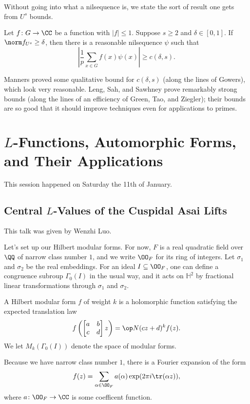 \documentclass{article}
\begin{document}
Without going into what a nilsequence is, we state the sort of result one gets from $U^s$ bounds.
\begin{theorem}
	Let $f\colon G\to\CC$ be a function with $\left|f\right|\le1$. Suppose $s\ge2$ and $\delta\in[0,1]$. If $\norm f_{U^s}\ge\delta$, then there is a reasonable nilsequence $\psi$ such that
	\[\left|\frac1p\sum_{x\in G}f(x)\psi(x)\right|\ge c(\delta,s).\]
\end{theorem}
Manners proved some qualitative bound for $c(\delta,s)$ (along the lines of Gowers), which look very reasonable. Leng, Sah, and Sawhney prove remarkably strong bounds (along the lines of an efficiency of Green, Tao, and Ziegler); their bounds are so good that it should improve techniques even for applications to primes.

\section{\texorpdfstring{ $L$}{ L}-Functions, Automorphic Forms, and Their Applications}
This session happened on Saturday the 11th of January.

\subsection{Central \texorpdfstring{$L$}{ L}-Values of the Cuspidal Asai Lifts}
This talk was given by Wenzhi Luo.

Let's set up our Hilbert modular forms. For now, $F$ is a real quadratic field over $\QQ$ of narrow class number $1$, and we write $\OO_F$ for its ring of integers. Let $\sigma_1$ and $\sigma_2$ be the real embeddings. For an ideal $I\subseteq\OO_F$, one can define a congruence subroup $\Gamma_0(I)$ in the usual way, and it acts on $\mathbb H^2$ by fractional linear transformations through $\sigma_1$ and $\sigma_2$.
\begin{definition}
	A Hilbert modular form $f$ of weight $k$ is a holomorphic function satisfying the expected translation law
	\[f\left(\begin{bmatrix}
		a & b \\ c & d
	\end{bmatrix}z\right)=\op N(cz+d)^kf(z).\]
	We let $M_k(\Gamma_0(I))$ denote the space of modular forms.
\end{definition}
Because we have narrow class number $1$, there is a Fourier expansion of the form
\[f(z)=\sum_{\alpha\in\OO_F}a(\alpha)\exp(2\pi i\tr(\alpha z)),\]
where $a\colon\OO_F\to\CC$ is some coefficent function.
\end{document}
